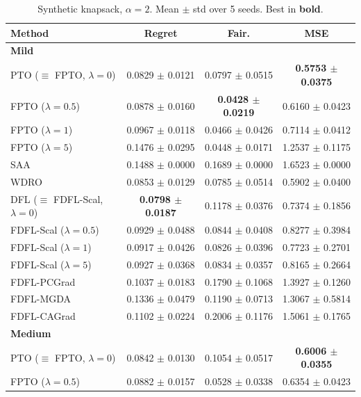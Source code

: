 \documentclass[ijoc,sglanonrev]{informs4}
\begin{document}
\begin{table}[htbp]
\centering
\caption{Synthetic knapsack, $\alpha=2$. Mean $\pm$ std over 5 seeds. Best in \textbf{bold}.}
\label{tab:knapsack-a2}
\small
\begin{tabular}{lccc}
\toprule
Method & Regret & Fair. & MSE \\
\midrule
\multicolumn{4}{l}{\textbf{Mild}} \\
PTO ($\equiv$ FPTO, $\lambda=0$) 
    & 0.0829 $\pm$ 0.0121 & 0.0797 $\pm$ 0.0515 & \textbf{0.5753 $\pm$ 0.0375} \\
FPTO ($\lambda=0.5$) 
    & 0.0878 $\pm$ 0.0160 & \textbf{0.0428 $\pm$ 0.0219} & 0.6160 $\pm$ 0.0423 \\
FPTO ($\lambda=1$) 
    & 0.0967 $\pm$ 0.0118 & 0.0466 $\pm$ 0.0426 & 0.7114 $\pm$ 0.0412 \\
FPTO ($\lambda=5$) 
    & 0.1476 $\pm$ 0.0295 & 0.0448 $\pm$ 0.0171 & 1.2537 $\pm$ 0.1175 \\
SAA 
    & 0.1488 $\pm$ 0.0000 & 0.1689 $\pm$ 0.0000 & 1.6523 $\pm$ 0.0000 \\
WDRO 
    & 0.0853 $\pm$ 0.0129 & 0.0785 $\pm$ 0.0514 & 0.5902 $\pm$ 0.0400 \\
DFL ($\equiv$ FDFL-Scal, $\lambda=0$) 
    & \textbf{0.0798 $\pm$ 0.0187} & 0.1178 $\pm$ 0.0376 & 0.7374 $\pm$ 0.1856 \\
FDFL-Scal ($\lambda=0.5$) 
    & 0.0929 $\pm$ 0.0488 & 0.0844 $\pm$ 0.0408 & 0.8277 $\pm$ 0.3984 \\
FDFL-Scal ($\lambda=1$) 
    & 0.0917 $\pm$ 0.0426 & 0.0826 $\pm$ 0.0396 & 0.7723 $\pm$ 0.2701 \\
FDFL-Scal ($\lambda=5$) 
    & 0.0927 $\pm$ 0.0368 & 0.0834 $\pm$ 0.0357 & 0.8165 $\pm$ 0.2664 \\
FDFL-PCGrad 
    & 0.1037 $\pm$ 0.0183 & 0.1790 $\pm$ 0.1068 & 1.3927 $\pm$ 0.1260 \\
FDFL-MGDA 
    & 0.1336 $\pm$ 0.0479 & 0.1190 $\pm$ 0.0713 & 1.3067 $\pm$ 0.5814 \\
FDFL-CAGrad 
    & 0.1102 $\pm$ 0.0224 & 0.2006 $\pm$ 0.1176 & 1.5061 $\pm$ 0.1765 \\
\midrule
\multicolumn{4}{l}{\textbf{Medium}} \\
PTO ($\equiv$ FPTO, $\lambda=0$) 
    & 0.0842 $\pm$ 0.0130 & 0.1054 $\pm$ 0.0517 & \textbf{0.6006 $\pm$ 0.0355} \\
FPTO ($\lambda=0.5$) 
    & 0.0882 $\pm$ 0.0157 & 0.0528 $\pm$ 0.0338 & 0.6354 $\pm$ 0.0423 \\

\end{tabular}
\end{table}
\end{document}
